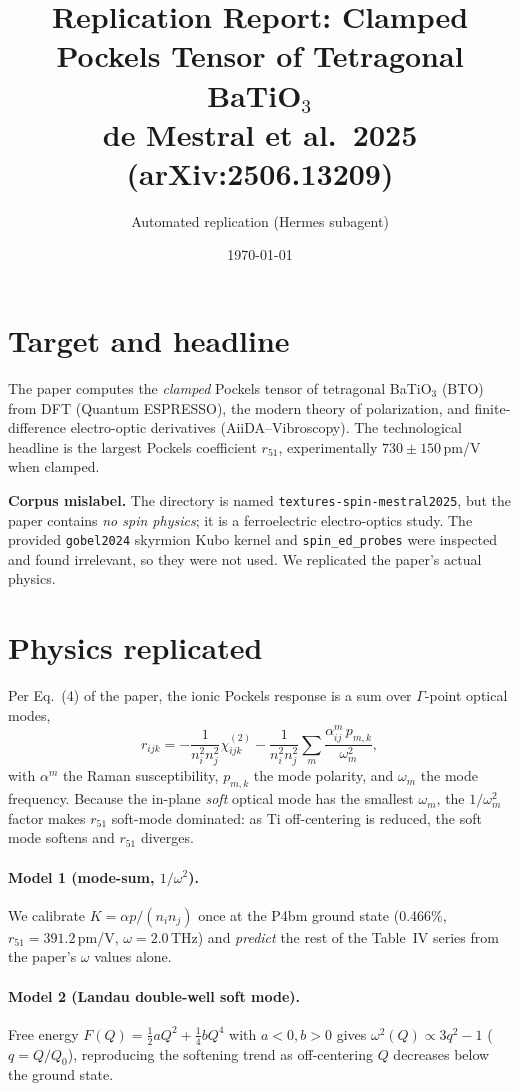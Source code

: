 \documentclass[11pt]{article}
\title{Replication Report: Clamped Pockels Tensor of Tetragonal BaTiO$_3$\\
\large de Mestral et al.\ 2025 (arXiv:2506.13209)}
\author{Automated replication (Hermes subagent)}
\date{\today}
\begin{document}
\maketitle

\section{Target and headline}
The paper computes the \emph{clamped} Pockels tensor of tetragonal BaTiO$_3$ (BTO)
from DFT (Quantum ESPRESSO), the modern theory of polarization, and finite-difference
electro-optic derivatives (AiiDA--Vibroscopy). The technological headline is the largest
Pockels coefficient $r_{51}$, experimentally $730\pm150$\,pm/V when clamped.

\textbf{Corpus mislabel.} The directory is named \texttt{textures-spin-mestral2025},
but the paper contains \emph{no spin physics}; it is a ferroelectric electro-optics
study. The provided \texttt{gobel2024} skyrmion Kubo kernel and \texttt{spin\_ed\_probes}
were inspected and found irrelevant, so they were not used. We replicated the paper's
actual physics.

\section{Physics replicated}
Per Eq.~(4) of the paper, the ionic Pockels response is a sum over $\Gamma$-point
optical modes,
\begin{equation}
r_{ijk} = -\frac{1}{n_i^2 n_j^2}\chi^{(2)}_{ijk}
          -\frac{1}{n_i^2 n_j^2}\sum_m \frac{\alpha^m_{ij}\,p_{m,k}}{\omega_m^2},
\end{equation}
with $\alpha^m$ the Raman susceptibility, $p_{m,k}$ the mode polarity, and $\omega_m$
the mode frequency. Because the in-plane \emph{soft} optical mode has the smallest
$\omega_m$, the $1/\omega_m^2$ factor makes $r_{51}$ soft-mode dominated: as Ti
off-centering is reduced, the soft mode softens and $r_{51}$ diverges.

\paragraph{Model 1 (mode-sum, $1/\omega^2$).} We calibrate
$K=\alpha p/(n_i n_j)$ once at the P4bm ground state (0.466\%, $r_{51}=391.2$\,pm/V,
$\omega=2.0$\,THz) and \emph{predict} the rest of the Table~IV series from the paper's
$\omega$ values alone.

\paragraph{Model 2 (Landau double-well soft mode).} Free energy
$F(Q)=\tfrac12 aQ^2+\tfrac14 bQ^4$ with $a<0,b>0$ gives
$\omega^2(Q)\propto 3q^2-1$ ($q=Q/Q_0$), reproducing the softening trend as
off-centering $Q$ decreases below the ground state.
\end{document}
